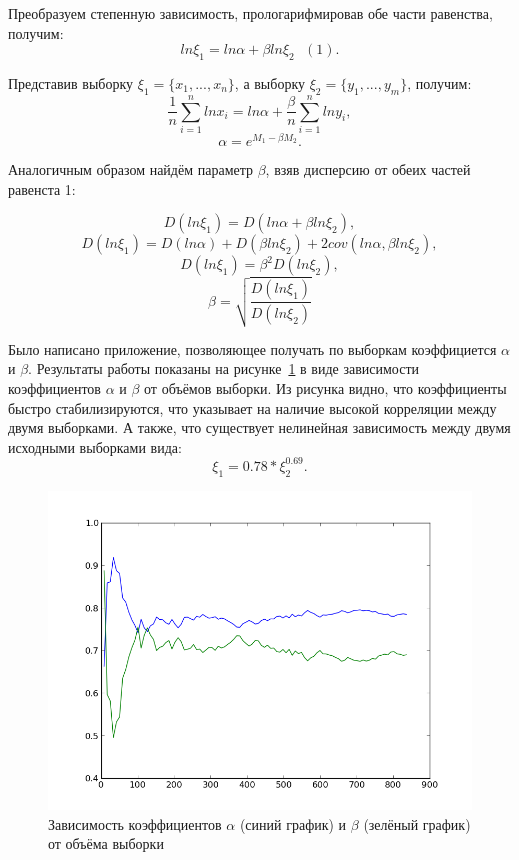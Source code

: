 \documentclass[12pt,a4paper,oneside]{extarticle}
\begin{document}
    Преобразуем степенную зависимость, прологарифмировав обе части равенства, получим: $$ln \xi_1 = ln \alpha + \beta ln \xi_2~~~ (1).$$


       
    Представив выборку $\xi_1 = \{x_1, . . . , x_n\}$, а выборку $\xi_2 = \{y_1, . . . , y_m\}$, получим:
    $$\frac{1}{n}\sum_{i=1}^{n} ln x_i = ln \alpha + \frac{\beta}{n} \sum_{i=1}^{n} ln y_i,$$
    $$\alpha = e^{M_1-\beta M_2}.$$

    Аналогичным образом найдём параметр $\beta$, взяв дисперсию от обеих частей равенста 1:

    $$D (ln \xi_1) = D(ln \alpha + \beta ln \xi_2),$$
    $$D (ln \xi_1) = D(ln \alpha) + D(\beta ln \xi_2) + 2 cov(ln \alpha, \beta ln \xi_2),$$
    $$D (ln \xi_1) = \beta^2 D(ln \xi_2), $$
    $$\beta = \sqrt{\frac{D (ln \xi_1)}{D (ln \xi_2)}}$$

    Было написано приложение, позволяющее получать по выборкам коэффициется $\alpha$ и $\beta$. Результаты работы показаны на рисунке~\ref{pic:tree} в виде зависимости коэффициентов $\alpha$ и $\beta$ от объёмов выборки. Из рисунка видно, что коэффициенты быстро стабилизируются, что указывает на наличие высокой корреляции между двумя выборками. А также, что существует нелинейная зависимость между двумя исходными выборками вида: $$\xi_1 = 0.78*\xi_2^{0.69}.$$ 

    \begin{figure}[h!]
        \center
        \includegraphics[scale=0.7]{../model.png}
        \caption{Зависимость коэффициентов $\alpha$ (синий график) и $\beta$ (зелёный график) от объёма выборки}
        \label{pic:tree}
    \end{figure}
\end{document}
